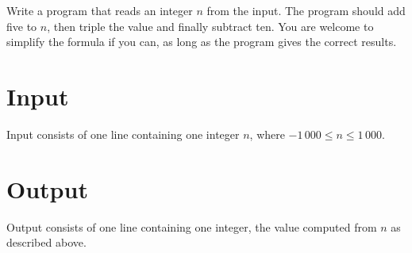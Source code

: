 
Write a program that reads an integer $n$ from the input.
The program should add five to $n$, then triple the value and finally subtract ten.
You are welcome to simplify the formula if you can, as long as the program gives the correct results.

\section*{Input}
Input consists of one line containing one integer $n$, where $-1\,000 \leq n \leq 1\,000$.

\section*{Output}
Output consists of one line containing one integer, the value computed from $n$ as described above.
